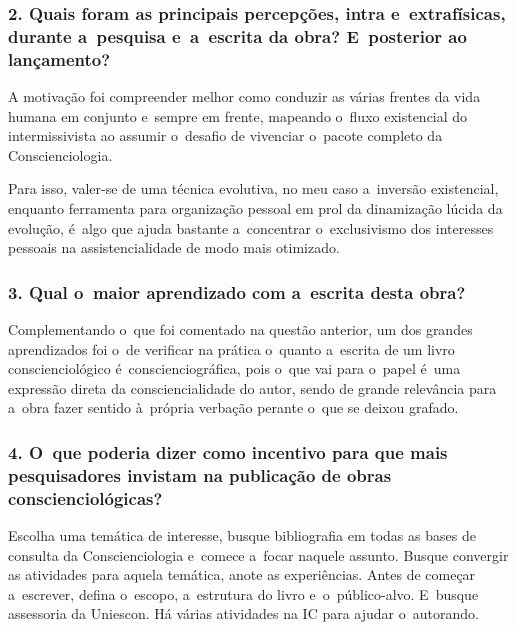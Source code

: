 \documentclass{gescons}
\begin{document}
\begin{multicols}{2}
\subsubsection{2.       Quais foram as principais percepções, intra e~extrafísicas, durante a~pesquisa e~a~escrita da obra? E~posterior ao lançamento?}

A motivação foi compreender melhor como conduzir as várias frentes da vida humana em conjunto e~sempre em frente, mapeando o~fluxo existencial do intermissivista ao assumir o~desafio de vivenciar o~pacote completo da Conscienciologia.

Para isso, valer-se de uma técnica evolutiva, no meu caso a~inversão existencial, enquanto ferramenta para organização pessoal em prol da dinamização lúcida da evolução, é~algo que ajuda bastante a~concentrar o~exclusivismo dos interesses pessoais na assistencialidade de modo mais otimizado.



\subsubsection{3.       Qual o~maior aprendizado com a~escrita desta obra?}

Complementando o~que foi comentado na questão anterior, um dos grandes aprendizados foi o~de verificar na prática o~quanto a~escrita de um livro conscienciológico é~conscienciográfica, pois o~que vai para o~papel é~uma expressão direta da consciencialidade do autor, sendo de grande relevância para a~obra fazer sentido à~própria verbação perante o~que se deixou grafado.


\subsubsection{4.       O~que poderia dizer como incentivo para que mais pesquisadores invistam na publicação de obras conscienciológicas?}

Escolha uma temática de interesse, busque bibliografia em todas as bases de consulta da Conscienciologia e~comece a~focar naquele assunto. Busque convergir as atividades para aquela temática, anote as experiências. Antes de começar a~escrever, defina o~escopo, a~estrutura do livro e~o~público-alvo. E~busque assessoria da Uniescon. Há várias atividades na IC para ajudar o~autorando. 
    

\end{multicols}
\end{document}
